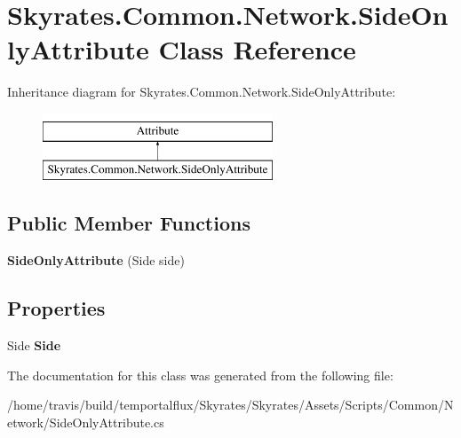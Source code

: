 \hypertarget{class_skyrates_1_1_common_1_1_network_1_1_side_only_attribute}{\section{Skyrates.\-Common.\-Network.\-Side\-Only\-Attribute Class Reference}
\label{class_skyrates_1_1_common_1_1_network_1_1_side_only_attribute}
}
Inheritance diagram for Skyrates.\-Common.\-Network.\-Side\-Only\-Attribute\-:\begin{figure}[H]
\begin{center}
\leavevmode
\includegraphics[height=2.000000cm]{class_skyrates_1_1_common_1_1_network_1_1_side_only_attribute}
\end{center}
\end{figure}
\subsection*{Public Member Functions}
\begin{DoxyCompactItemize}
\item 
\hypertarget{class_skyrates_1_1_common_1_1_network_1_1_side_only_attribute_a1182d8df33ae3ef04f88883abefdd599}{{\bfseries Side\-Only\-Attribute} (Side side)}\label{class_skyrates_1_1_common_1_1_network_1_1_side_only_attribute_a1182d8df33ae3ef04f88883abefdd599}

\end{DoxyCompactItemize}
\subsection*{Properties}
\begin{DoxyCompactItemize}
\item 
\hypertarget{class_skyrates_1_1_common_1_1_network_1_1_side_only_attribute_ad1304815e408a7ea47f6b364f568624e}{Side {\bfseries Side}}\label{class_skyrates_1_1_common_1_1_network_1_1_side_only_attribute_ad1304815e408a7ea47f6b364f568624e}

\end{DoxyCompactItemize}


The documentation for this class was generated from the following file\-:\begin{DoxyCompactItemize}
\item 
/home/travis/build/temportalflux/\-Skyrates/\-Skyrates/\-Assets/\-Scripts/\-Common/\-Network/Side\-Only\-Attribute.\-cs\end{DoxyCompactItemize}
